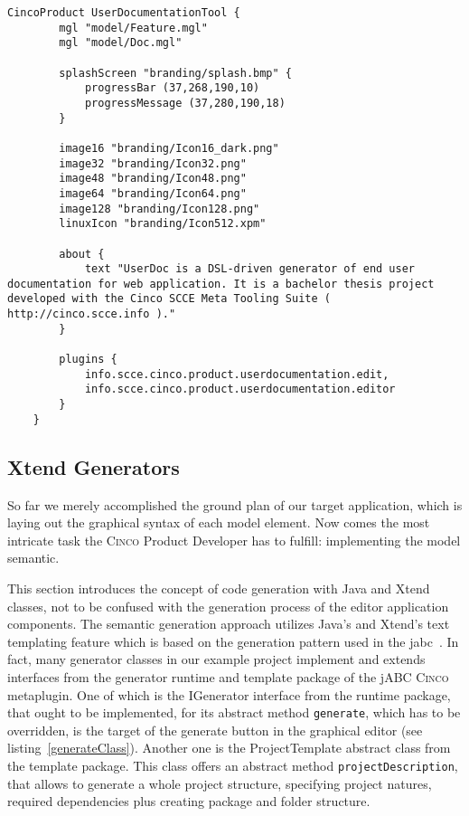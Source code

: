 \begin{lstlisting}[language=MGL, caption={UserDocumentationTool.cpd}]
    CincoProduct UserDocumentationTool {
        mgl "model/Feature.mgl"
        mgl "model/Doc.mgl"
        
        splashScreen "branding/splash.bmp" {
            progressBar (37,268,190,10)
            progressMessage (37,280,190,18)
        }
    
        image16 "branding/Icon16_dark.png"
        image32 "branding/Icon32.png"
        image48 "branding/Icon48.png"
        image64 "branding/Icon64.png"
        image128 "branding/Icon128.png"
        linuxIcon "branding/Icon512.xpm"
	
        about {
            text "UserDoc is a DSL-driven generator of end user documentation for web application. It is a bachelor thesis project developed with the Cinco SCCE Meta Tooling Suite ( http://cinco.scce.info )."
        }

        plugins {
            info.scce.cinco.product.userdocumentation.edit,
            info.scce.cinco.product.userdocumentation.editor
        }
    }
\end{lstlisting}

\subsection{Xtend Generators}\label{sec:GEN}

So far we merely accomplished the ground plan of our target application, which is laying out the graphical syntax of each model element. Now comes the most intricate task the \textsc{Cinco} Product Developer has to fulfill: implementing the model semantic. 

This section introduces the concept of code generation with Java and Xtend classes, not to be confused with the generation process of the editor application components. The semantic generation approach utilizes Java's and Xtend's text templating feature which is based on the generation pattern used in the \acrfull{jabc}~\cite{model-driver-dev_jABC,jabc-home}. In fact, many generator classes in our example project implement and extends interfaces from the generator runtime and template package of the jABC \textsc{Cinco} metaplugin. One of which is the IGenerator interface from the runtime package, that ought to be implemented, for its abstract method \lstinline{generate}, which has to be overridden, is the target of the generate button in the graphical editor (see listing~\ref{generateClass}). Another one is the ProjectTemplate abstract class from the template package. This class offers an abstract method \lstinline{projectDescription}, that allows to generate a whole project structure, specifying project natures, required dependencies plus creating package and folder structure.

